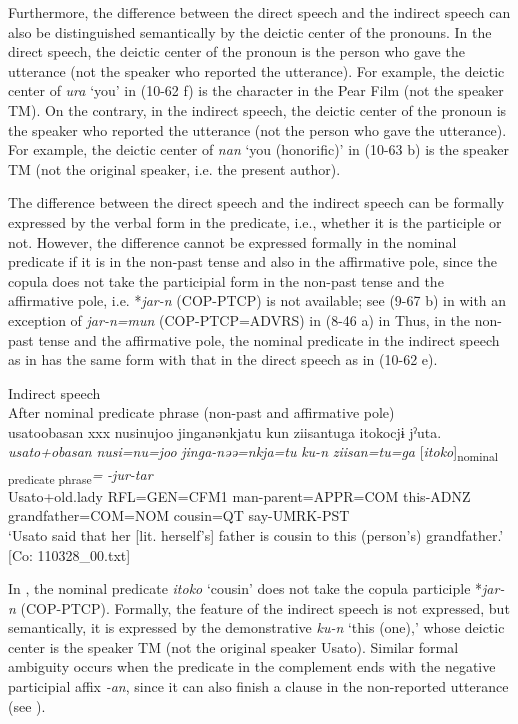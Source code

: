   Furthermore, the difference between the direct speech and the indirect speech can also be distinguished semantically by the deictic center of the pronouns. In the direct speech, the deictic center of the pronoun is the person who gave the utterance (not the speaker who reported the utterance). For example, the deictic center of \textit{ura} ‘you’ in (10-62 f) is the character in the Pear Film (not the speaker TM). On the contrary, in the indirect speech, the deictic center of the pronoun is the speaker who reported the utterance (not the person who gave the utterance). For example, the deictic center of \textit{nan} ‘you (honorific)’ in (10-63 b) is the speaker TM (not the original speaker, i.e. the present author).

The difference between the direct speech and the indirect speech can be formally expressed by the verbal form in the predicate, i.e., whether it is the participle or not. However, the difference cannot be expressed formally in the nominal predicate if it is in the non-past tense and also in the affirmative pole, since the copula does not take the participial form in the non-past tense and the affirmative pole, i.e. *\textit{jar-n} (COP-PTCP) is not available; see (9-67 b) in  with an exception of \textit{jar-n=mun} (COP-PTCP=ADVRS) in (8-46 a) in  Thus, in the non-past tense and the affirmative pole, the nominal predicate in the indirect speech as in  has the same form with that in the direct speech as in (10-62 e).

\ea\label{ex:10.64}   Indirect speech\\
  After nominal predicate phrase (non-past and affirmative pole)\\
      \glll    usato{\textbar}obasan{\textbar}  xxx  nusinujoo  jinganənkjatu  kun  ziisantuga  {\textbar}itoko{\textbar}cjɨ   jˀuta.\\
    \textit{usato+obasan}    \textit{nusi=nu=joo}  \textit{jinga-nəə=nkja=tu}  \textit{ku-n}  \textit{ziisan=tu=ga}  [\textit{itoko}]\textsubscript{nominal predicate phrase}\textit{=} \textit{-jur-tar}\\
    Usato+old.lady    RFL=GEN=CFM1  man-parent=APPR=COM this-ADNZ  grandfather=COM=NOM  cousin=QT   say-UMRK-PST\\
    \glt ‘Usato said that her [lit. herself’s] father is cousin to this (person’s) grandfather.’ [Co: 110328\_00.txt]
\z

In , the nominal predicate \textit{itoko} ‘cousin’ does not take the copula participle *\textit{jar-n} (COP-PTCP). Formally, the feature of the indirect speech is not expressed, but semantically, it is expressed by the demonstrative \textit{ku-n} ‘this (one),’ whose deictic center is the speaker TM (not the original speaker Usato). Similar formal ambiguity occurs when the predicate in the complement ends with the negative participial affix \textit{{}-an}, since it can also finish a clause in the non-reported utterance (see ).

